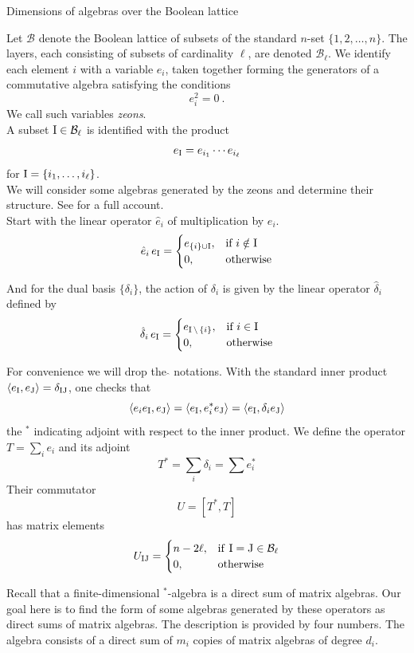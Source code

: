 \documentclass[12pt,reqno]{amsart}
\def\I{{\rm I}}
\def\J{{\rm J}}
\def\B{\mathcal{B}}
\begin{document}
\begin{section}{Dimensions of algebras over the Boolean lattice}

Let $\B$ denote the Boolean lattice of subsets of the standard $n$-set $\{1,2,\ldots,n\}$.
The layers, each consisting of subsets of cardinality $\ell$, are denoted $\B_\ell$. We identify
each element $i$ with a variable $e_i$, taken together forming the generators of a commutative algebra satisfying the conditions
$$e_i^2=0\ .$$
We call such variables \textit{zeons}.\\

A subset $\I\in\B_\ell$ is identified with the product
$$e_\I=e_{i_1}\cdots e_{i_\ell}$$
for $\I=\{i_1,\ldots,i_\ell\}$.\\

We will consider some algebras generated by the zeons and determine their
structure. See \cite{F1} for a full account.\\

Start with  the linear operator $\hat e_i$ of multiplication by $e_i$. 
$$ \hat e_i\, e_\I=\begin{cases} e_{\{i\}\cup \I}, & \text{if } i\notin\I\\
0, &\text{otherwise}
\end{cases}
$$

And for the dual basis $\{\delta_i\}$, the action of $\delta_i$ is given by the linear operator $\hat\delta_i$ defined by
$$ \hat \delta_i\, e_\I=\begin{cases} e_{\I\,\setminus\,\{i\}},  & \text{if } i\in\I\\
0, &\text{otherwise}
\end{cases}
$$

For convenience we will drop the $\hat{}$ notations.
With the standard inner product $\langle e_\I,e_\J \rangle=\delta_{\I \J}$, one checks that
$$\langle e_ie_\I,e_\J \rangle = \langle e_\I, e_i^*e_\J \rangle=\langle e_\I,\delta_ie_\J \rangle$$
the ${}^*$ indicating adjoint with respect to the inner product. We define the operator $T=\sum_i e_i$
and its adjoint 
$$T^*=\sum_i\delta_i=\sum e_i^*$$
Their commutator
$$U=[T^*,T]$$
has matrix elements
$$ U_{\I\J}=\begin{cases} n-2\ell, & \mathrm{ if }\  \I=\J \in\B_\ell  \\
0,& \mathrm{ otherwise }
\end{cases}
$$

Recall that a finite-dimensional ${}^*$-algebra is a direct sum of matrix algebras. 
Our goal here is to find the form of some algebras generated by these operators as direct sums of matrix algebras.
The description is provided by four numbers. The algebra consists of a direct sum of $m_i$ copies of matrix algebras of degree $d_i$. \bigskip


\end{section}
\end{document}
